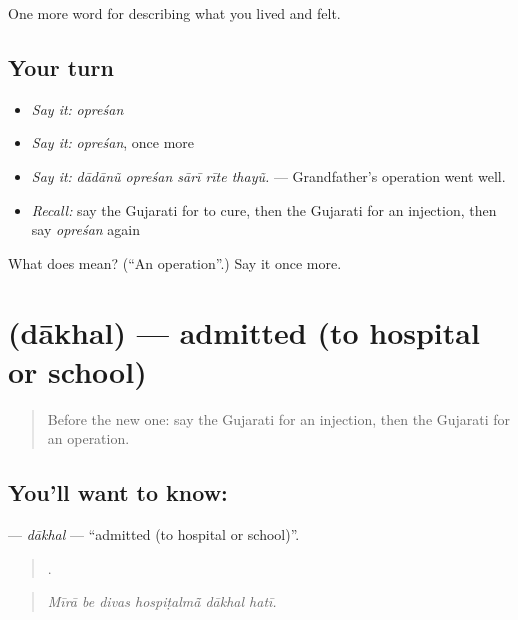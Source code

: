 \begin{grammarlens}[title={What you've built}]
One more word for describing what you lived and felt.
\end{grammarlens}

\subsection*{Your turn}
\begin{itemize}
\raggedright
  \item \emph{Say it:} \emph{opreśan}
  \item \emph{Say it:} \emph{opreśan}, once more
  \item \emph{Say it:} \emph{dādānũ opreśan sārī rīte thayũ.} — Grandfather's operation went well.
  \item \emph{Recall:} say the Gujarati for to cure, then the Gujarati for an injection, then say \emph{opreśan} again
\end{itemize}

\begin{tcolorbox}[breakable,colback=teal!4,colframe=teal!35!black,title={Before you move on}]
What does  mean? (\textquotedblleft{}An operation\textquotedblright{}.) Say it once more.
\end{tcolorbox}
\section[\texorpdfstring{\gu{દાખલ} (dākhal)}{દાખલ (dākhal)}]{ (dākhal) — admitted (to hospital or school)}

\label{lesson:GU-C485-dakhal}



\begin{quote}
Before the new one: say the Gujarati for an injection, then the Gujarati for an operation.
\end{quote}

\subsection*{You'll want to know: }
\textbf{} — \emph{dākhal} — \textquotedblleft{}admitted (to hospital or school)\textquotedblright{}.

\begin{quote}
     .
\end{quote}

\begin{quote}
\emph{Mīrā be divas hospiṭalmā̃ dākhal hatī.}
\end{quote}

